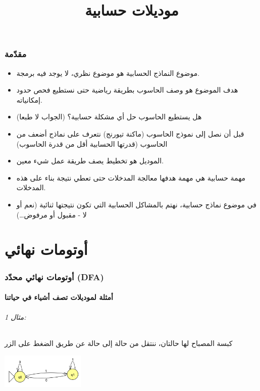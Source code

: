\documentclass[12pt]{article}
\title{موديلات حسابية}
\begin{document}
\maketitle

\renewcommand{\contentsname}{جدول المحتويات}
\tableofcontents
\clearpage

\section{مقدّمة}

\begin{itemize}
    \item موضوع النماذج الحسابية هو موضوع نظري، لا يوجد فيه برمجة.
    \item هدف الموضوع هو وصف الحاسوب بطريقة رياضية حتى نستطيع فحص حدود إمكانياته.
    \item هل يستطيع الحاسوب حل أي مشكلة حسابية؟ (الجواب لا طبعا)
    \item قبل أن نصل إلى نموذج الحاسوب (ماكنة تيورنج) نتعرف على نماذج أضعف من الحاسوب (قدرتها الحسابية أقل من قدرة الحاسوب)
    \item الموديل هو تخطيط يصف طريقة عمل شيء معين.
    \item مهمة حسابية هي مهمة هدفها معالجة المدخلات حتى تعطي نتيجة بناء على هذه المدخلات.
    \item في موضوع نماذج حسابية، نهتم بالمشاكل الحسابية التي تكون نتيجتها ثنائية (نعم أو لا - مقبول أو مرفوض\ldots)
\end{itemize}

\clearpage
\part{أوتومات نهائي}
\section{أوتومات نهائي محدّد (DFA)}

\subsection{أمثلة لموديلات تصف أشياء في حياتنا}

\paragraph{مثال 1:} كبسة المصباح لها حالتان، ننتقل من حالة إلى حالة عن طريق الضغط على الزر
\begin{center}
\includegraphics[width=0.3\textwidth]{../../../images/DFAs/01_lamp_dfa.png}
\end{center}
\end{document}

